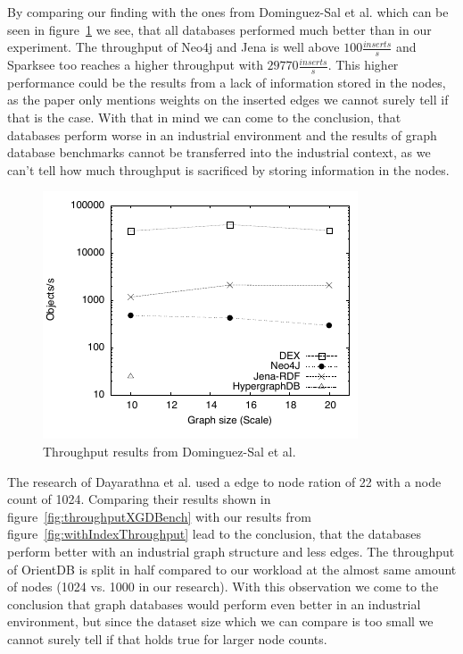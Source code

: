 By comparing our finding with the ones from Dominguez-Sal et al.\cite{TaoShen} which can be seen in figure~\ref{fig:throughputShen} we see,
that all databases performed much better than in our experiment.
The throughput of Neo4j and Jena is well above $ 100 \frac{inserts}{s} $ and Sparksee too reaches a higher throughput with $ 29770 \frac{inserts}{s} $.
This higher performance could be the results from a lack of information stored in the nodes,
as the paper only mentions weights on the inserted edges we cannot surely tell if that is the case.
With that in mind we can come to the conclusion,
that databases perform worse in an industrial environment and the results of graph database benchmarks cannot be transferred into the industrial context,
as we can't tell how much throughput is sacrificed by storing information in the nodes.

\begin{figure}[!h]
  \centering
  \includegraphics[width=.8\textwidth]{images/benchmarks/ShenResultsInsert}
  \caption{Throughput results from Dominguez-Sal et al.\cite{TaoShen}}
  \label{fig:throughputShen}
\end{figure}

The research of Dayarathna et al.\cite{Dayarathna2012} used a edge to node ration of 22 with a node count of 1024.
Comparing their results shown in figure~\ref{fig:throughputXGDBench} with our results from figure~\ref{fig:withIndexThroughput} lead to the conclusion,
that the databases perform better with an industrial graph structure and less edges.
The throughput of OrientDB is split in half compared to our workload at the almost same amount of nodes (1024 vs. 1000 in our research).
With this observation we come to the conclusion that graph databases would perform even better in an industrial environment,
but since the dataset size which we can compare is too small we cannot surely tell if that holds true for larger node counts.

